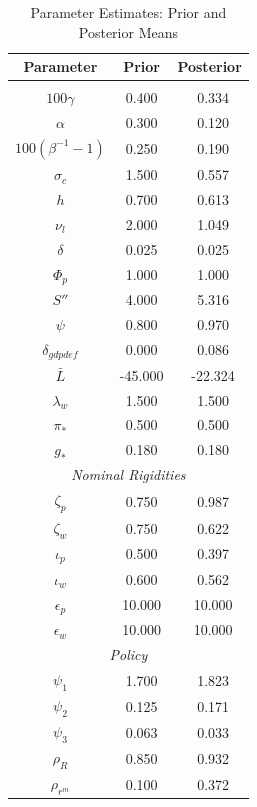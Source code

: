 \documentclass[12pt]{article}
\begin{document}
\pagestyle{empty}
\vspace*{.5cm}
\begin{longtable}{ccc}
\caption{Parameter Estimates: Prior and Posterior Means}
\\ \hline
Parameter & Prior & Posterior
\\ \hline
\endhead
\hline
\endfoot
\multicolumn{7}{c}{\textit{Steady State}} \\[3pt]
$ 100\gamma$ &    0.400 & \   0.334 \\
$ \alpha$ &    0.300 & \   0.120 \\
$ 100(\beta^{-1} - 1)$ &    0.250 & \   0.190 \\
$ \sigma_{c}$ &    1.500 & \   0.557 \\
$    h$ &    0.700 & \   0.613 \\
$ \nu_l$ &    2.000 & \   1.049 \\
$ \delta$ &    0.025 & \   0.025 \\
$ \Phi_p$ &    1.000 & \   1.000 \\
$  S''$ &    4.000 & \   5.316 \\
$ \psi$ &    0.800 & \   0.970 \\
$ \delta_{gdpdef}$ &    0.000 & \   0.086 \\
$ \bar{L}$ &  -45.000 & \ -22.324 \\
$ \lambda_w$ &    1.500 & \   1.500 \\
$ \pi_*$ &    0.500 & \   0.500 \\
$  g_*$ &    0.180 & \   0.180 \\
\multicolumn{7}{c}{\textit{Nominal Rigidities}} \\[3pt]
$ \zeta_p$ &    0.750 & \   0.987 \\
$ \zeta_w$ &    0.750 & \   0.622 \\
$ \iota_p$ &    0.500 & \   0.397 \\
$ \iota_w$ &    0.600 & \   0.562 \\
$ \epsilon_{p}$ &   10.000 & \  10.000 \\
$ \epsilon_{w}$ &   10.000 & \  10.000 \\
\multicolumn{7}{c}{\textit{Policy}} \\[3pt]
$ \psi_1$ &    1.700 & \   1.823 \\
$ \psi_2$ &    0.125 & \   0.171 \\
$ \psi_3$ &    0.063 & \   0.033 \\
$ \rho_R$ &    0.850 & \   0.932 \\
$ \rho_{r^m}$ &    0.100 & \   0.372 \\

\end{longtable}
\end{document}
